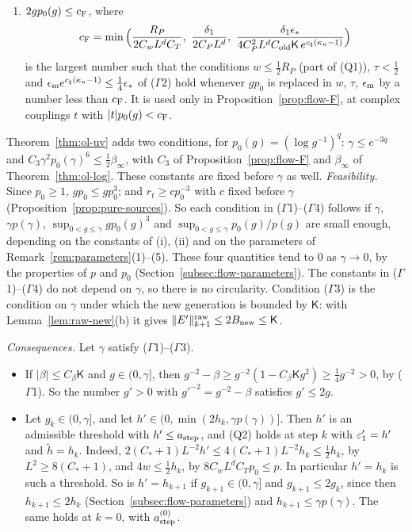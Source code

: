 \begin{remark}
\begin{enumerate}[label=(\roman*)]
\begin{enumerate}[label=($\Gamma$\arabic*)]
\item\label{eq:gamma-F} $2gp_0(g)\le c_{\rm F}$, where
\[
c_{\rm F}=\min\Big(\frac{R_P}{2C_wL^dC_T},\ \frac{\delta_1}{2C_PL^d},\ \frac{\delta_1\epsilon_*}{4C_P^2L^dC_{\rm old}\mathsf K\,e^{c_\natural(\kappa_n-1)}}\Big)
\]
is the largest number such that the conditions $w\le\frac12R_P$ (part of (Q1)), $\tau<\frac12$ and $\epsilon_{\rm m}e^{c_\natural(\kappa_n-1)}\le\frac14\epsilon_*$ of ($\Gamma$2) hold whenever $gp_0$ is replaced in $w$, $\tau$, $\epsilon_{\rm m}$ by a number less than $c_{\rm F}$. It is used only in Proposition~\ref{prop:flow-F}, at complex couplings $t$ with $|t|p_0(g)<c_{\rm F}$.
\end{enumerate}
\end{enumerate}
Theorem~\ref{thm:ol-uv} adds two conditions, for $p_0(g)=(\log g^{-1})^q$: $\gamma\le e^{-3q}$ and $C_3\gamma^2p_0(\gamma)^6\le\frac12\beta_\infty$, with $C_3$ of Proposition~\ref{prop:flow-F} and $\beta_\infty$ of Theorem~\ref{thm:ol-log}. These constants are fixed before $\gamma$ as well.
\emph{Feasibility.} Since $p_0\ge1$, $gp_0\le gp_0^3$; and $r_t\ge cp_0^{-3}$ with $c$ fixed before $\gamma$ (Proposition~\ref{prop:pure-sources}). So each condition in ($\Gamma$1)--($\Gamma$4) follows if $\gamma$, $\gamma p(\gamma)$, $\sup_{0<g\le\gamma}gp_0(g)^3$ and $\sup_{0<g\le\gamma}p_0(g)/p(g)$ are small enough, depending on the constants of (i), (ii) and on the parameters of Remark~\ref{rem:parameters}(1)--(5). These four quantities tend to $0$ as $\gamma\to0$, by the properties of $p$ and $p_0$ (Section~\ref{subsec:flow-parameters}). The constants in ($\Gamma$1)--($\Gamma$4) do not depend on $\gamma$, so there is no circularity. Condition ($\Gamma$3) is the condition on $\gamma$ under which the new generation is bounded by $\mathsf K$: with Lemma~\ref{lem:raw-new}(b) it gives $\|E'\|^{\rm raw}_{k+1}\le2B_{\rm new}\le\mathsf K$.

\emph{Consequences.} Let $\gamma$ satisfy ($\Gamma$1)--($\Gamma$3).
\begin{itemize}
\item If $|\beta|\le C_\beta\mathsf K$ and $g\in(0,\gamma]$, then $g^{-2}-\beta\ge g^{-2}(1-C_\beta\mathsf Kg^2)\ge\frac14g^{-2}>0$, by ($\Gamma$1). So the number $g'>0$ with $g'^{-2}=g^{-2}-\beta$ satisfies $g'\le2g$.
\item Let $g_k\in(0,\gamma]$, and let $h'\in(0,\min(2h_k,\gamma p(\gamma))]$. Then $h'$ is an admissible threshold with $h'\le a_{\rm step}$, and (Q2) holds at step $k$ with $\varepsilon'_1=h'$ and $\tilde h=h_k$. Indeed, $2(C_*+1)L^{-2}h'\le4(C_*+1)L^{-2}h_k\le\frac12h_k$, by $L^2\ge8(C_*+1)$, and $4w\le\frac12h_k$, by $8C_wL^dC_Tp_0\le p$. In particular $h'=h_k$ is such a threshold. So is $h'=h_{k+1}$ if $g_{k+1}\in(0,\gamma]$ and $g_{k+1}\le2g_k$, since then $h_{k+1}\le2h_k$ (Section~\ref{subsec:flow-parameters}) and $h_{k+1}\le\gamma p(\gamma)$. The same holds at $k=0$, with $a^{(0)}_{\rm step}$.
\end{itemize}
\end{remark}

